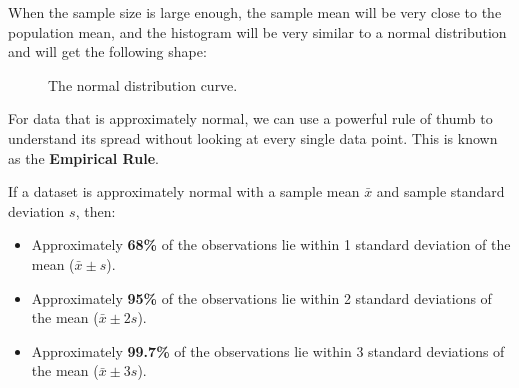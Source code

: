 When the sample size is large enough, the sample mean will be very close to the population mean, and the histogram will be very similar to a normal distribution and will get the following shape:

\begin{figure}[h!]
    \centering
    \caption{The normal distribution curve.}
    \label{fig:normal_curve_smooth}
\end{figure}

For data that is approximately normal, we can use a powerful rule of thumb to understand its spread without looking at every single data point. This is known as the \textbf{Empirical Rule}.

\begin{theorem}
If a dataset is approximately normal with a sample mean $\bar{x}$ and sample standard deviation $s$, then:
\begin{itemize}
    \item Approximately \textbf{68\%} of the observations lie within 1 standard deviation of the mean ($\bar{x} \pm s$).
    \item Approximately \textbf{95\%} of the observations lie within 2 standard deviations of the mean ($\bar{x} \pm 2s$).
    \item Approximately \textbf{99.7\%} of the observations lie within 3 standard deviations of the mean ($\bar{x} \pm 3s$).
\end{itemize}
\end{theorem}

